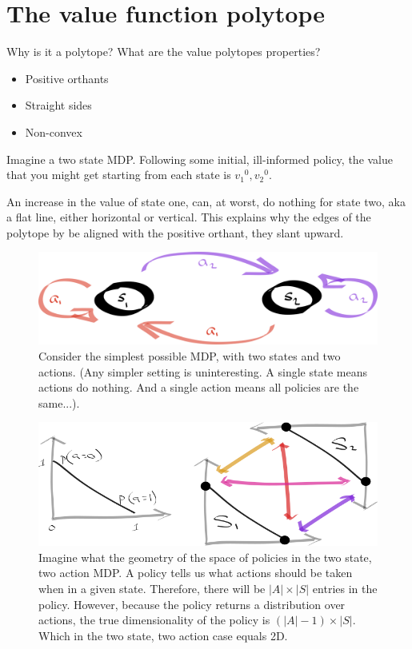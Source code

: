 \section{The value function polytope}

Why is it a polytope?
What are the value polytopes properties?

\begin{itemize}
\tightlist
\item
  Positive orthants
\item
  Straight sides
\item
  Non-convex
\end{itemize}

Imagine a two state MDP. Following some initial, ill-informed policy,
the value that you might get starting from each state is
${v_1}^0, {v_2}^0$.

An increase in the value of state one, can, at worst, do nothing for state two, aka a
flat line, either horizontal or vertical. This explains why the edges of the polytope by be
aligned with the positive orthant, they slant upward.


\begin{figure}
\centering
\includegraphics[width=1\textwidth,height=0.25\textheight]{../../pictures/drawings/2-state-automata.png}
\caption{Consider the simplest possible MDP, with two states and two actions. (Any simpler setting is uninteresting. A single state means actions do nothing.
And a single action means all policies are the same...).}
\end{figure}

\begin{figure}
\centering
\includegraphics[width=1\textwidth,height=0.25\textheight]{../../pictures/drawings/2-state-2-action-simplices.png}
\caption{Imagine what the geometry of the space of policies in the two state, two action MDP. A policy tells us what actions should be taken when in a given state. Therefore, there will be \(|A| \times |S|\) entries in the policy. However, because the policy returns a distribution over actions, the true dimensionality of the policy is \((|A| -1) \times |S|\). Which in the two state, two action case equals 2D.}
\end{figure}

